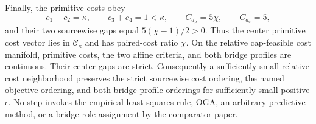 Finally, the primitive costs obey
\[
 c_1+c_2=\kappa,
 \qquad c_3+c_4=1<\kappa,
 \qquad C_{d_{\mathrm p}}=5\chi,
 \qquad C_{d_{\mathrm e}}=5,
\]
and their two sourcewise gaps equal \(5(\chi-1)/2>0\).  Thus the center primitive cost vector lies in \(\mathcal C_\kappa\) and has paired-cost ratio \(\chi\).  On the relative cap-feasible cost manifold, primitive costs, the two affine criteria, and both bridge profiles are continuous.  Their center gaps are strict.  Consequently a sufficiently small relative cost neighborhood preserves the strict sourcewise cost ordering, the named objective ordering, and both bridge-profile orderings for sufficiently small positive \(\epsilon\).  No step invokes the empirical least-squares rule, OGA, an arbitrary predictive method, or a bridge-role assignment by the comparator paper.